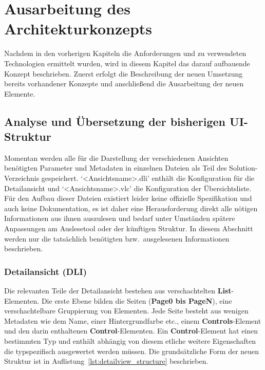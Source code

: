 \chapter{Ausarbeitung des Architekturkonzepts}\label{chap:concept}
Nachdem in den vorherigen Kapiteln die Anforderungen und zu verwendeten Technologien ermittelt wurden, wird in diesem Kapitel das darauf aufbauende Konzept beschrieben. Zuerst erfolgt die Beschreibung der neuen Umsetzung bereits vorhandener Konzepte und anschließend die Ausarbeitung der neuen Elemente.

\section{Analyse und Übersetzung der bisherigen UI-Struktur}\label{sec:ui_structure_translation}
Momentan werden alle für die Darstellung der verschiedenen Ansichten benötigten Parameter und Metadaten in einzelnen Dateien als Teil des Solution-Verzeichnis gespeichert. `<Ansichtsname>.dli' enthält die Konfiguration für die Detailansicht und `<Ansichtsname>.vlc' die Konfiguration der Übersichtsliste. Für den Aufbau dieser Dateien existiert leider keine offizielle Spezifikation und auch keine Dokumentation, es ist daher eine Herausforderung direkt alle nötigen Informationen aus ihnen auszulesen und bedarf unter Umständen spätere Anpassungen am Auslesetool oder der künftigen Struktur. In diesem Abschnitt werden nur die tatsächlich benötigten bzw.\ ausgelesenen Informationen beschrieben.

\subsection{Detailansicht (DLI)}
Die relevanten Teile der Detailansicht bestehen aus verschachtelten \textbf{List}-Elementen. Die erste Ebene bilden die Seiten (\textbf{Page0 bis PageN}), eine verschachtelbare Gruppierung von Elementen. Jede Seite besteht aus wenigen Metadaten wie dem Name, einer Hintergrundfarbe etc., einem \textbf{Controls}-Element und den darin enthaltenen \textbf{Control}-Elementen. Ein \textbf{Control}-Element hat einen bestimmten Typ und enthält abhängig von diesem etliche weitere Eigenschaften die typspezifisch ausgewertet werden müssen. Die grundsätzliche Form der neuen Struktur ist in Auflistung~\ref{lst:detailview_structure} beschrieben.



